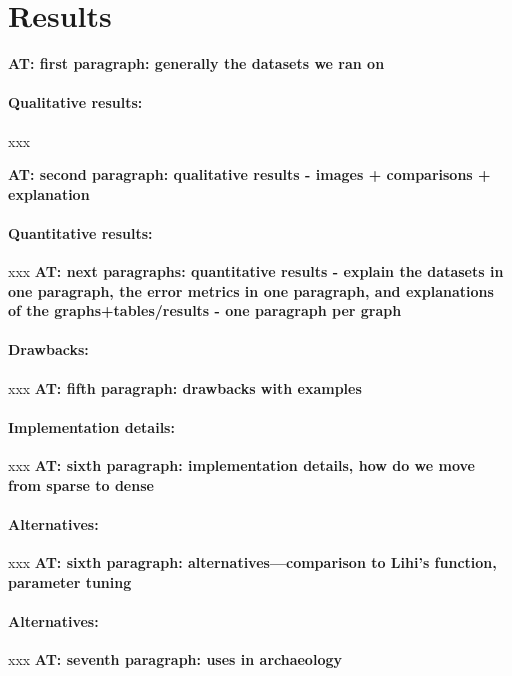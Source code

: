\documentclass[10pt,twocolumn,letterpaper]{article}
\newcommand{\colornote}[3]{{\color{#1}\bf{#2: #3}\normalfont}}
\newcommand{\colornote}[3]{}
\newcommand {\ayellet}[1]{\colornote{blue}{AT}{#1}}
\begin{document}
\section{Results}
\label{section:results}

\ayellet{first paragraph: generally the datasets we ran on}

\paragraph{Qualitative results:} xxx

\ayellet{second paragraph: qualitative results - images + comparisons + explanation}

\paragraph{Quantitative results:} xxx
\ayellet{next paragraphs: quantitative results - explain the datasets in one paragraph, the error metrics in one paragraph, and explanations of the graphs+tables/results - one paragraph per graph}

\paragraph{Drawbacks:} xxx
\ayellet{fifth paragraph: drawbacks with examples}

\paragraph{Implementation details:} xxx
\ayellet{sixth paragraph: implementation details, how do we move from sparse to dense}

\paragraph{Alternatives:} xxx
\ayellet{sixth paragraph: alternatives---comparison to Lihi's function, parameter tuning}

\paragraph{Alternatives:} xxx
\ayellet{seventh paragraph: uses in archaeology}
\end{document}
